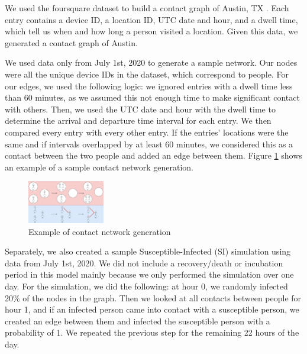 \documentclass[times, 10pt,twocolumn]{article}
\begin{document}


We used the foursquare dataset to build a contact graph of Austin, TX \cite{DVN/PFLAH4_2020}. Each entry contains a device ID, a location ID, UTC date and hour, and a dwell time, which tell us when and how long a person visited a location. Given this data, we generated a contact graph of Austin.

We used data only from July 1st, 2020 to generate a sample network. Our nodes were all the unique device IDs in the dataset, which correspond to people. For our edges, we used the following logic: we ignored entries with a dwell time less than 60 minutes, as we assumed this not enough time to make significant contact with others. Then, we used the UTC date and hour with the dwell time to determine the arrival and departure time interval for each entry. We then compared every entry with every other entry. If the entries' locations were the same and if intervals overlapped by at least 60 minutes, we considered this as a contact between the two people and added an edge between them. Figure \ref{fig:toy_label} shows an example of a sample contact network generation. 

\begin{figure}
    \centering
    \includegraphics[width=0.30\textwidth]{imgs/Network_Toy.png}
    \caption{Example of contact network generation}
    \label{fig:toy_label}
\end{figure}


Separately, we also created a sample Susceptible-Infected (SI) simulation using data from July 1st, 2020. We did not include a recovery/death or incubation period in this model mainly because we only performed the simulation over one day. For the simulation, we did the following: at hour 0, we randomly infected 20\% of the nodes in the graph. Then we looked at all contacts between people for hour 1, and if an infected person came into contact with a susceptible person, we created an edge between them and infected the susceptible person with a probability of 1. We repeated the previous step for the remaining 22 hours of the day.
\end{document}
